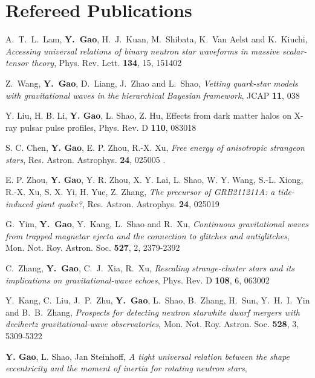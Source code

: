 \section{\sc Refereed Publications}
\begin{etaremune}
  \item 
  A.~T.~L.~Lam, {\bf Y.~Gao}, H.~J.~Kuan, M.~Shibata, K.~Van Aelst and K.~Kiuchi,
  {\it Accessing universal relations of binary neutron star waveforms in massive scalar-tensor theory},
  Phys. Rev. Lett. {\bf 134}, 15, 151402
  \item 
  Z.~Wang, {\bf Y.~Gao}, D.~Liang, J.~Zhao and L.~Shao,
  {\it Vetting quark-star models with gravitational waves in the hierarchical Bayesian framework},
  JCAP {\bf 11}, 038
  \item 
  Y. Liu, H. B. Li, {\bf Y. Gao}, L. Shao, Z. Hu, Effects from dark matter halos on X-ray pulsar pulse profiles, Phys. Rev. D {\bf 110}, 083018 
  \item 
  S. C. Chen, {\bf Y. Gao}, E. P. Zhou, R.-X. Xu, {\it Free energy of anisotropic strangeon stars}, Res. Astron. Astrophys. {\bf 24}, 025005 .
  \item 
  E. P. Zhou, 
  {\bf Y. Gao}, 
  Y. R. Zhou, 
  X. Y. Lai, L. Shao, W. Y. Wang, S.-L. Xiong, R.-X. Xu, S. X. Yi, H. Yue, Z. Zhang, 
  {\it The precursor of GRB211211A: a tide-induced giant quake?}, Res. Astron. Astrophys. {\bf 24}, 025019
  \item 
  G.~Yim, {\bf Y.~Gao}, Y.~Kang, L.~Shao and R.~Xu,
  {\it Continuous gravitational waves from trapped magnetar ejecta and the connection to glitches and antiglitches},
  Mon. Not. Roy. Astron. Soc. {\bf 527}, 2, 2379-2392 
  \item 
  C.~Zhang, 
  {\bf Y.~Gao}, 
  C.~J.~Xia,
  R.~Xu,
  {\it Rescaling strange-cluster stars and its implications on gravitational-wave echoes},
  Phys. Rev. D {\bf 108}, 6, 063002
  \item 
  Y.~Kang, C.~Liu, J.~P.~Zhu, {\bf Y.~Gao}, L.~Shao, B.~Zhang, H.~Sun, Y.~H.~I.~Yin and B.~B.~Zhang,
  {\it Prospects for detecting neutron star\textendash{}white dwarf mergers with decihertz gravitational-wave observatories},
  Mon. Not. Roy. Astron. Soc. {\bf 528}, 3, 5309-5322
  \item 
  {\bf Y. Gao},
  L. Shao,
  Jan Steinhoff,
  {\it A tight universal relation between the shape eccentricity and the moment of inertia for rotating neutron stars},

\end{etaremune}
